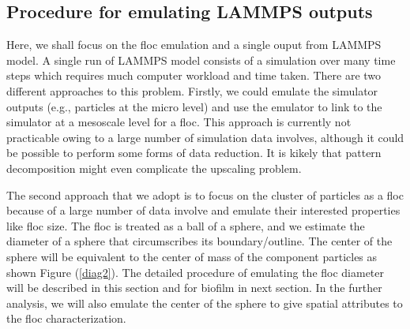 
\subsection{Procedure for emulating LAMMPS outputs}
Here, we shall focus on the floc emulation and a single ouput from LAMMPS model. A single run of LAMMPS model consists of a simulation over many time steps which requires much computer workload and time taken. There are two different approaches to this problem. Firstly, we could emulate the simulator outputs (e.g., particles at the micro level) and use the emulator to link to the simulator at a mesoscale level for a floc. This approach is currently not practicable owing to a large number of simulation data involves, although it could be possible to perform some forms of data reduction. It is kikely that pattern decomposition might even complicate the upscaling problem. %

The second approach that we adopt is to focus on the cluster of particles as a floc because of a large number of data involve and emulate their interested properties like floc size. The floc is treated as a ball of a sphere, and we estimate the diameter of a sphere that circumscribes its boundary/outline. The center of the sphere will be equivalent to the center of mass of the component particles as shown Figure (\ref{diag2}). The detailed procedure of emulating the floc diameter will be described in this section and for biofilm in next section. In the further analysis, we will also emulate the center of the sphere to give spatial attributes to the floc characterization.

